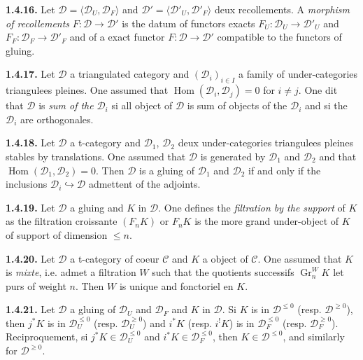 \documentclass[12pt,a4paper]{article}
\theoremstyle{plain}
\theoremstyle{definition}
\theoremstyle{remark}
\DeclareMathOperator{\Hom}{Hom}
\DeclareMathOperator{\Gr}{Gr}
\newcommand{\cC}{\mathcal{C}}
\newcommand{\cD}{\mathcal{D}}
\begin{document}
\smallskip

\noindent
\textbf{1.4.16.} Let $\cD = \langle \cD_{U}, \cD_{F} \rangle$ and $\cD' = \langle \cD'_{U}, \cD'_{F} \rangle$ deux recollements. A \emph{morphism of recollements} $F : \cD \to \cD'$ is the datum of functors exacts $F_{U} : \cD_{U} \to \cD'_{U}$ and $F_{F} : \cD_{F} \to \cD'_{F}$ and of a exact functor $F : \cD \to \cD'$ compatible to the functors of gluing.

\smallskip

\noindent
\textbf{1.4.17.} Let $\cD$ a triangulated category and $(\cD_{i})_{i \in I}$ a family of under-categories triangulees pleines. One assumed that $\Hom(\cD_{i}, \cD_{j}) = 0$ for $i \neq j$. One dit that $\cD$ is \emph{sum of the} $\cD_{i}$ si all object of $\cD$ is sum of objects of the $\cD_{i}$ and si the $\cD_{i}$ are orthogonales.

\smallskip

\noindent
\textbf{1.4.18.} Let $\cD$ a t-category and $\cD_{1}$, $\cD_{2}$ deux under-categories triangulees pleines stables by translations. One assumed that $\cD$ is generated by $\cD_{1}$ and $\cD_{2}$ and that $\Hom(\cD_{1}, \cD_{2}) = 0$. Then $\cD$ is a gluing of $\cD_{1}$ and $\cD_{2}$ if and only if the inclusions $\cD_{i} \hookrightarrow \cD$ admettent of the adjoints.

\smallskip

\noindent
\textbf{1.4.19.} Let $\cD$ a gluing and $K$ in $\cD$. One defines the \emph{filtration by the support} of $K$ as the filtration croissante $(F_{n}K)$ or $F_{n}K$ is the more grand under-object of $K$ of support of dimension $\leq n$.

\smallskip

\noindent
\textbf{1.4.20.} Let $\cD$ a t-category of coeur $\cC$ and $K$ a object of $\cC$. One assumed that $K$ is \emph{mixte}, i.e. admet a filtration $W$ such that the quotients successifs $\Gr_{n}^{W}K$ let purs of weight $n$. Then $W$ is unique and fonctoriel en $K$.

\smallskip

\noindent
\textbf{1.4.21.} Let $\cD$ a gluing of $\cD_{U}$ and $\cD_{F}$ and $K$ in $\cD$. Si $K$ is in $\cD^{\leq 0}$ (resp. $\cD^{\geq 0}$), then $j^{*}K$ is in $\cD_{U}^{\leq 0}$ (resp. $\cD_{U}^{\geq 0}$) and $i^{*}K$ (resp. $i^{!}K$) is in $\cD_{F}^{\leq 0}$ (resp. $\cD_{F}^{\geq 0}$). Reciproquement, si $j^{*}K \in \cD_{U}^{\leq 0}$ and $i^{*}K \in \cD_{F}^{\leq 0}$, then $K \in \cD^{\leq 0}$, and similarly for $\cD^{\geq 0}$.
\end{document}
